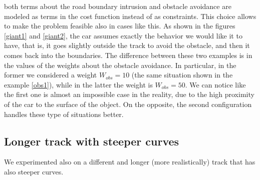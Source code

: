 \documentclass[a4paper, onecolumn, 12pt]{article}
\begin{document}
both terms about the road boundary intrusion and obstacle avoidance are modeled
as terms in the cost function instead of as constraints. This choice allows to make the
problem feasible also in cases like this. As shown in the figures \ref{giant1} and 
\ref{giant2}, the car assumes exactly the behavior we would like it to have, that is, 
it goes slightly outside the track to avoid the obstacle, and then it comes back into 
the boundaries. 
The difference between these two examples is in the values of the weights 
about the obstacle avoidance. In particular, in the former we considered a weight $W_{obs}=10$ 
(the same situation shown in the example \ref{obs1}), while in the latter the weight is
$W_{obs}=50$. We can notice like the first one is almost an impossible case in the reality,
due to the high proximity of the car to the surface of the object. On the opposite, the
second configuration handles these type of situations better.

\subsection{Longer track with steeper curves}

We experimented also on a different and longer (more realistically) track that
has also steeper curves.
\end{document}
